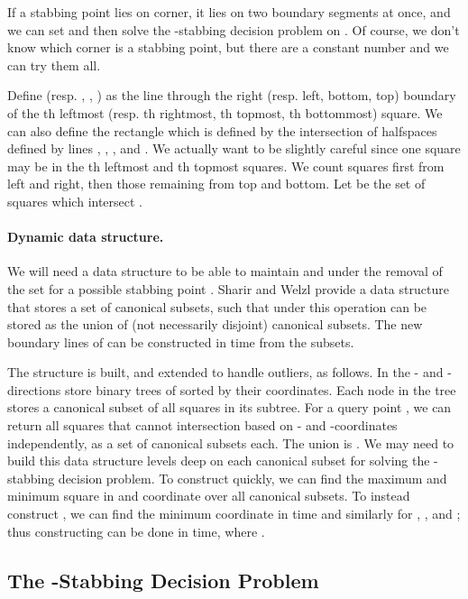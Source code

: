 \documentclass[11pt]{myclass}
\begin{document}
If a stabbing point  lies on corner, it lies on two boundary segments at once, and we can set  and then solve the -stabbing decision problem on .  Of course, we don't know which corner is a stabbing point, but there are a constant number and we can try them all.  

Define  (resp. , , ) as the line through the right (resp. left, bottom, top) boundary of the th leftmost (resp. th rightmost, th topmost, th bottommost) square.  
We can also define the rectangle  which is defined by the intersection of halfspaces defined by lines , , , and .  
We actually want to be slightly careful since one square may be in the th leftmost and th topmost squares.  We count squares first from left and right, then those remaining from top and bottom.  
Let  be the set of squares which intersect .  


\paragraph{Dynamic data structure.}
We will need a data structure to be able to maintain  and  under the removal of the set  for a possible stabbing point .  Sharir and Welzl \cite{SW96} provide a data structure that stores a set of canonical subsets, such that under this operation  can be stored as the union of  (not necessarily disjoint) canonical subsets.  The new boundary lines of  can be constructed in  time from the  subsets.  

The structure is built, and extended to handle outliers, as follows.
In the - and -directions store binary trees of  sorted by their coordinates.  Each node in the tree stores a canonical subset of all squares in its subtree.  For a query point , we can return all squares that cannot intersection  based on - and -coordinates independently, as a set of  canonical subsets each.  The union is .  
We may need to build this data structure  levels deep on each canonical subset for solving the -stabbing decision problem.  
To construct  quickly, we can find the maximum and minimum square in  and  coordinate over all  canonical subsets.  To instead construct , we can find the  minimum  coordinate in  time and similarly for , , and ; thus constructing  can be done in  time, where .  



\subsection{The -Stabbing Decision Problem}
\end{document}
